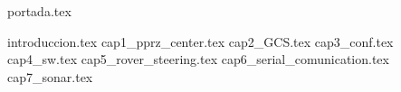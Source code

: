 \documentclass[a4paper,10pt]{book}
\begin{document}
{portada.tex}
\newpage

\bigskip
\tableofcontents
\newpage

\listoffigures
\newpage

{introduccion.tex}
{cap1_pprz_center.tex}
{cap2_GCS.tex}
{cap3_conf.tex}
{cap4_sw.tex}
{cap5_rover_steering.tex}
{cap6_serial_comunication.tex}
{cap7_sonar.tex}

\printindex
\end{document}
